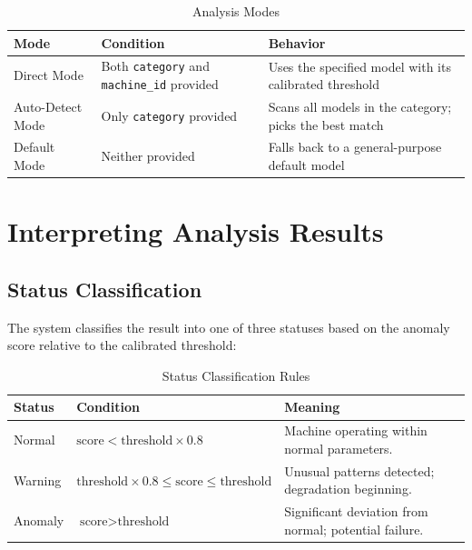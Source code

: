 \documentclass[10pt, a4paper, oneside]{report}
\begin{document}
\begin{table}[H]
\centering
\caption{Analysis Modes}
\label{tab:analysis-modes}
\begin{tabularx}{\textwidth}{l l X}
  \toprule
  \textbf{Mode} & \textbf{Condition} & \textbf{Behavior} \\
  \midrule
  Direct Mode      & Both \texttt{category} and \texttt{machine\_id} provided & Uses the specified model with its calibrated threshold \\
  Auto-Detect Mode & Only \texttt{category} provided & Scans all models in the category; picks the best match \\
  Default Mode     & Neither provided & Falls back to a general-purpose default model \\
  \bottomrule
\end{tabularx}
\end{table}

\section{Interpreting Analysis Results}
\label{sec:interpret-results}

\subsection{Status Classification}

The system classifies the result into one of three statuses based on the anomaly score relative to the calibrated threshold:

\begin{table}[H]
\centering
\caption{Status Classification Rules}
\label{tab:status-rules}
\begin{tabularx}{\textwidth}{l l X}
  \toprule
  \textbf{Status} & \textbf{Condition} & \textbf{Meaning} \\
  \midrule
  Normal  & $\text{score} < \text{threshold} \times 0.8$                                       & Machine operating within normal parameters. \\
  Warning & $\text{threshold} \times 0.8 \leq \text{score} \leq \text{threshold}$               & Unusual patterns detected; degradation beginning. \\
  Anomaly & $\text{score} > \text{threshold}$                                                   & Significant deviation from normal; potential failure. \\
  \bottomrule
\end{tabularx}
\end{table}
\end{document}
